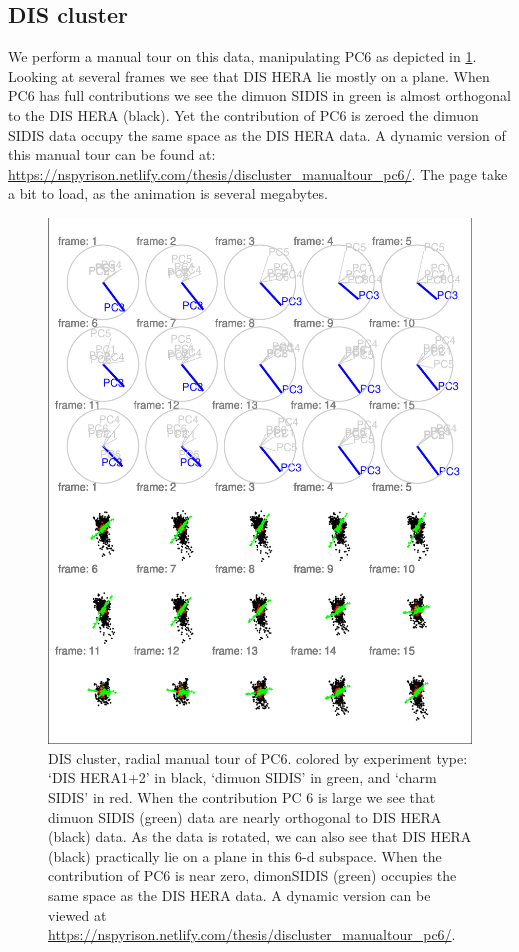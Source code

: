 \documentclass{monashthesis}
\begin{document}
\subsection{DIS cluster}\label{dis-cluster}

We perform a manual tour on this data, manipulating PC6 as depicted in
\ref{fig:DISclusterGood}. Looking at several frames we see that DIS HERA
lie mostly on a plane. When PC6 has full contributions we see the dimuon
SIDIS in green is almost orthogonal to the DIS HERA (black). Yet the
contribution of PC6 is zeroed the dimuon SIDIS data occupy the same
space as the DIS HERA data. A dynamic version of this manual tour can be
found at:
\url{https://nspyrison.netlify.com/thesis/discluster_manualtour_pc6/}.
The page take a bit to load, as the animation is several megabytes.

\begin{figure}
\centering
\includegraphics{thesis_files/figure-latex/DISclusterGood-1.pdf}
\caption{\label{fig:DISclusterGood}DIS cluster, radial manual tour of PC6.
colored by experiment type: `DIS HERA1+2' in black, `dimuon SIDIS' in
green, and `charm SIDIS' in red. When the contribution PC 6 is large we
see that dimuon SIDIS (green) data are nearly orthogonal to DIS HERA
(black) data. As the data is rotated, we can also see that DIS HERA
(black) practically lie on a plane in this 6-d subspace. When the
contribution of PC6 is near zero, dimonSIDIS (green) occupies the same
space as the DIS HERA data. A dynamic version can be viewed at
\url{https://nspyrison.netlify.com/thesis/discluster_manualtour_pc6/}.}
\end{figure}
\end{document}
